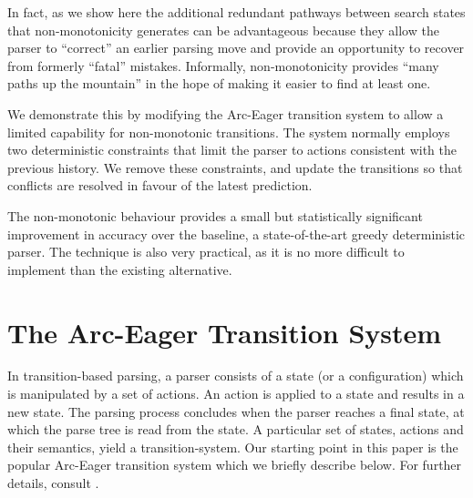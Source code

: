 \documentclass[11pt,letterpaper]{article}
\begin{document}
In fact, as we show here  the
additional redundant pathways between search states that non-monotonicity
generates can be advantageous because they allow the parser to ``correct'' an earlier
parsing move and provide an opportunity to recover from formerly ``fatal'' mistakes.
Informally, non-monotonicity provides ``many paths up the mountain'' in the hope
of making it easier to find at least one.

We demonstrate this by modifying the Arc-Eager transition system to allow a limited
capability for non-monotonic transitions. The system normally employs two
deterministic constraints that limit the parser to actions consistent with the
previous history. We remove these constraints, and update the transitions
so that conflicts are resolved in favour of the latest prediction.

The non-monotonic behaviour provides a small but statistically significant improvement in
accuracy over the baseline, a state-of-the-art greedy deterministic parser.
The technique is also very practical, as it is no more difficult to implement than
the existing alternative.



\section{The Arc-Eager Transition System}
In transition-based parsing, a parser consists of a state (or a
configuration) which is manipulated by a set of actions.  An action is
applied to a state and results in a new state.  The parsing process
concludes when the parser reaches a final state, at which the
parse tree is read from the state.  A particular set of states,
actions and their semantics, yield a transition-system. Our starting
point in this paper is the popular Arc-Eager transition system which
we briefly describe below.  For further details, consult
\citep{nivre:04,nivre:cl}.
\end{document}
